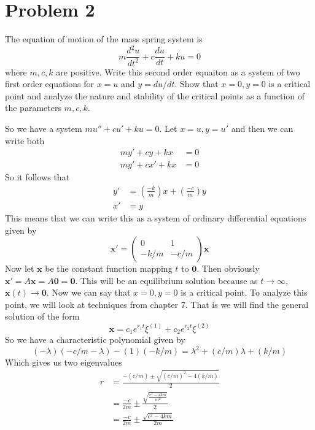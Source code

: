 \documentclass{article}
\theoremstyle{definition}
\begin{document}
\section*{Problem 2}
    \begin{mdframed}[]
        The equation of motion of the mass spring system is 
        \[
            m \dfrac{d^2 u}{dt^2} + c \dfrac{du}{dt} + ku = 0
        \]
        where $m, c, k$ are positive. Write this second order equaiton as a system of two first 
        order equations for $x = u$ and $y = du / dt$. Show that $x = 0, y = 0$ is a critical point 
        and analyze the nature and stability of the critical points as a function of the parameters
        $m,c,k$.
    \end{mdframed}
    So we have a system $mu'' + cu' + ku = 0$.
    Let $x = u, y = u'$ and then we can write both 
    \begin{align*}
        my' + cy + kx &= 0 \\
        my' + cx' + kx &= 0
    \end{align*}
    So it follows that 
    \begin{align*}
        y' &= \left(\frac{-k}{m}\right)x + \left(\frac{-c}{m}\right)y\\   
        x' &= y
    \end{align*}
    This means that we can write this as a system of ordinary differential equations
    given by 
    \[
        \bm x' =
        \begin{pmatrix}
            0 & 1 \\
            -k / m & -c / m
        \end{pmatrix}\bm x 
    \]
    Now let $\bm x$ be the constant function mapping $t$ to $\bm 0$. Then obviously $\bm x' = A \bm x = A \bm 0 = \bm 0$.
    This will be an equilibrium solution because as $t \rightarrow \infty$, $\bm x(t) \rightarrow \bm 0$.
    Now we can say that $x = 0, y = 0$ is a critical point. To analyze this point, we will look at techniques from 
    chapter 7.
    That is we will find the general solution of the form 
    \[
        \bm x = c_1 e^{r_1 t} \xi^{(1)} + c_2 e^{r_2 t} \xi^{(2)}   
    \]
    So we have a characteristic polynomial given by 
    \[
        (-\lambda)(-c / m - \lambda) - (1)(-k / m) = \lambda^2 + (c / m) \lambda + (k / m)   
    \]
    Which gives us two eigenvalues
    \begin{align*}
        r &= \frac{-(c/m) \pm \sqrt{(c/m)^2 - 4(k/m)}}{2} \\
        &= \frac{-c}{2m} \pm \frac{\sqrt{\frac{c^2 - 4km}{m^2}}}{2} \\
        &= \frac{-c}{2m} \pm \frac{\sqrt{c^2 - 4km}}{2m}
    \end{align*}
\end{document}
